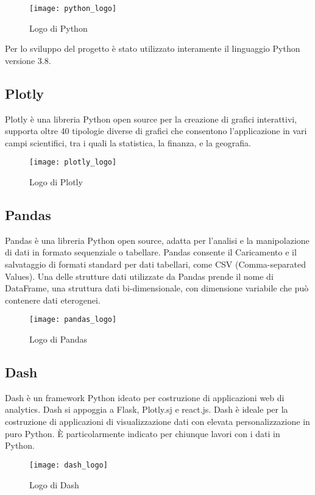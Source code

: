 \begin{figure}[htp]
    \centering
    \texttt{[image: python\_logo]}
    \caption{Logo di Python}
\end{figure}
\noindent Per lo sviluppo del progetto è stato utilizzato interamente il linguaggio Python versione 3.8.

\subsection{Plotly}

Plotly è una libreria Python open source per la creazione di grafici interattivi, supporta oltre 40 tipologie diverse di grafici che consentono l’applicazione in vari campi scientifici, tra i quali la statistica, la finanza, e la geografia.

\begin{figure}[htp]
    \centering
    \texttt{[image: plotly\_logo]}
    \caption{Logo di Plotly}
\end{figure}

\subsection{Pandas}
Pandas è una libreria Python open source, adatta  per l’analisi e la manipolazione di dati in formato sequenziale o tabellare.
Pandas consente il Caricamento e il salvataggio di formati standard per dati tabellari, come CSV (Comma-separated Values).
Una delle strutture dati utilizzate da Pandas prende il nome di DataFrame, una struttura dati bi-dimensionale, con dimensione variabile che può contenere dati eterogenei.
\begin{figure}[htp]
    \centering
    \texttt{[image: pandas\_logo]}
    \caption{Logo di Pandas}
\end{figure}

\subsection{Dash}
Dash è un framework Python ideato per costruzione di applicazioni web di analytics.
Dash si appoggia a Flask, Plotly.sj e react.js.
\noindent Dash è ideale per la costruzione di applicazioni di visualizzazione dati con elevata personalizzazione in puro Python. 
È particolarmente indicato per chiunque lavori con i dati in Python.

\begin{figure}[htp]
    \centering
    \texttt{[image: dash\_logo]}
    \caption{Logo di Dash}
\end{figure}


